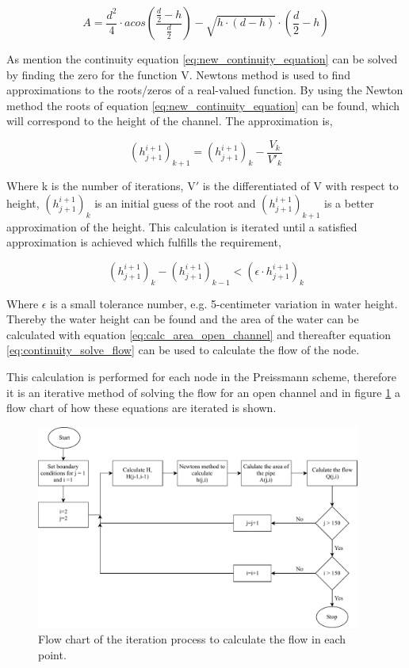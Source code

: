 \begin{equation}\label{eq:calc_area_open_channel}
	A = \frac {d^2}{4} \cdot acos \left(\frac{\frac{d}{2}-h}{\frac{d}{2}}\right)-\sqrt{h\cdot (d-h)}\cdot  \left(\frac{d}{2}-h\right)
\end{equation}

As mention the continuity equation \ref{eq:new_continuity_equation} can be solved by finding the zero for the function V. Newtons method is used to find approximations to the roots/zeros of a real-valued function. By using the Newton method the roots of equation \ref{eq:new_continuity_equation} can be found, which will correspond to the height of the channel. The approximation is,

\begin{equation}
	 (h_{j+1}^{i+1})_{k+1} =(h_{j+1}^{i+1})_{k} - \frac{V_k}{V'_k}
\end{equation}

Where k is the number of iterations, V$'$ is the differentiated of V with respect to height, $(h_{j+1}^{i+1})_{k}$ is an initial guess of the root and $(h_{j+1}^{i+1})_{k+1}$ is a better approximation of the height. This calculation is iterated until a satisfied approximation is achieved which fulfills the requirement,

\begin{equation}
	\left(h_{j+1}^{i+1}\right)_{k}-(h_{j+1}^{i+1})_{k-1} < (\epsilon \cdot h_{j+1}^{i+1})_{k}
\end{equation}

Where $\epsilon$ is a small tolerance number, e.g. 5-centimeter variation in water height. Thereby the water height can be found and the area of the water can be calculated with equation \ref{eq:calc_area_open_channel}  and thereafter equation \ref{eq:continuity_solve_flow} can be used to calculate the flow of the node.

This calculation is performed for each node in the Preissmann scheme, therefore it is an iterative method of solving the flow for an open channel and in figure \ref{fig:flow_chart_iteration} a flow chart of how these equations are iterated is shown.
\begin{figure}[H]
	\centering
	\includegraphics[width=0.95\textwidth]{report/simulation/pictures/flow_chart_iteration.pdf}
	\caption{Flow chart of the iteration process to calculate the flow in each point.}
	\label{fig:flow_chart_iteration}
\end{figure}

